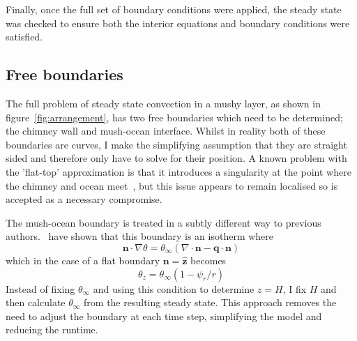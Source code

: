 \documentclass[11pt]{proc}
\begin{document}
Finally, once the full set of boundary conditions were applied, the steady state was checked to ensure both the interior equations and boundary conditions were satisfied.

\subsection{Free boundaries}

The full problem of steady state convection in a mushy layer, as shown in figure~\ref{fig:arrangement}, has two free boundaries which need to be determined; the chimney wall and mush-ocean interface. Whilst in reality both of these boundaries are curves, I make the simplifying assumption that they are straight sided and therefore only have to solve for their position. A known problem with the 'flat-top' approximation is that it introduces a singularity at the point where the chimney and ocean meet~\citep*{schulze-worster-98}, but this issue appears to remain localised so is accepted as a necessary compromise.

The mush-ocean boundary is treated in a subtly different way to previous authors.~\citet*{chung-worster-02} have shown that this boundary is an isotherm where
\begin{equation}
\mathbf{n} \cdot \nabla \theta = \theta_\infty \left( \nabla \cdot \mathbf{n} - \mathbf{q} \cdot \mathbf{n} \right)
\end{equation}
which in the case of a flat boundary $\mathbf{n} = \mathbf{\hat{z}}$ becomes
\begin{equation}
\theta_z = \theta_\infty (1-\psi_r / r)
\end{equation}
Instead of fixing $\theta_\infty$ and using this condition to determine $z=H$, I fix $H$ and then calculate $\theta_\infty$ from the resulting steady state. This approach removes the need to adjust the boundary at each time step, simplifying the model and reducing the runtime.
\end{document}
